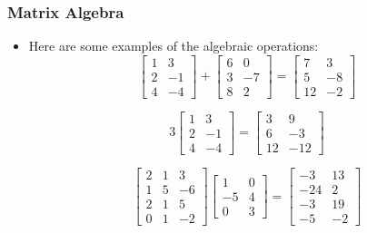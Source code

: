 \documentclass[notheorems,mathserif,table,compress]{beamer}  %
\begin{document}
\begin{frame}
\frametitle{Matrix Algebra}
\begin{itemize}
\item Here are some examples of the algebraic operations:
\begin{displaymath}
\begin{bmatrix}
1 & 3\\
2 & -1\\
4 & -4
\end{bmatrix}
+
\begin{bmatrix}
6 & 0\\
3 & -7\\
8 & 2
\end{bmatrix}
=
\begin{bmatrix}
7 & 3\\
5 & -8\\
12 & -2
\end{bmatrix}
\end{displaymath}

\begin{displaymath}
3
\begin{bmatrix}
1 & 3\\
2 & -1\\
4 & -4
\end{bmatrix}
=
\begin{bmatrix}
3 & 9\\
6 & -3\\
12 & -12
\end{bmatrix}
\end{displaymath}

\begin{displaymath}
\begin{bmatrix}
2 & 1 & 3\\
1 & 5 & -6\\
2 & 1 & 5 \\
0 & 1 & -2
\end{bmatrix}
\begin{bmatrix}
1 & 0\\
-5 & 4\\
0 & 3
\end{bmatrix}
=
\begin{bmatrix}
-3 & 13\\
-24 & 2\\
-3 & 19 \\
-5 & -2
\end{bmatrix}
\end{displaymath}

\end{itemize}
\end{frame}
\end{document}
